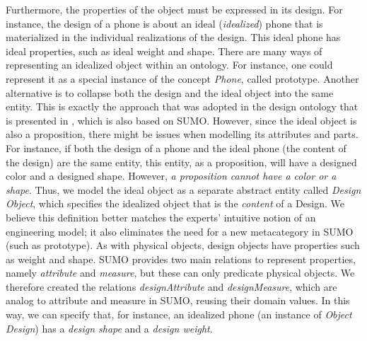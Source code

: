 \documentclass[preprint,12pt]{elsarticle}
\newcommand{\hlc}[2][yellow]{ {\sethlcolor{#1} \hl{#2}} }
\newcommand{\paulo}[1]{{\hlc[cyan]{\textbf{Paulo}: #1}}}
\newcommand{\joel}[1]{{\hlc[green]{\textbf{Joel}: #1}}}
\begin{document}
Furthermore, the properties of the object must be expressed in its design. For instance, the design of a phone is about an ideal (\emph{idealized}) phone that is materialized in the individual realizations of the design. This ideal phone has ideal properties, such as ideal weight and shape. There are many ways of representing an idealized object within an ontology. For instance, one could represent it as a special instance of the concept \emph{Phone}, called prototype. Another alternative is to collapse both the design and the ideal object into the same entity. This is exactly the approach that was adopted in the design ontology that is presented in \cite{Storga2010design}, which is also based on SUMO. However, since the ideal object is also a proposition, there might be issues when modelling its attributes and parts. For instance, if both the design of a phone and the ideal phone (the content of the design) are the same entity, this entity, as a proposition, will have a designed color and a designed shape. However, \emph{a proposition cannot have a color or a shape}. Thus, we model the ideal object as a separate abstract entity called \emph{Design Object}, which specifies the idealized object that is the \emph{content} of a Design. We believe this definition better matches the experts' intuitive notion of an engineering model; it also eliminates the need for a new metacategory in SUMO (such as prototype). As with physical objects, design objects have properties such as weight and shape. SUMO provides two main relations to represent properties, namely \emph{attribute} and \emph{measure}, but these can only predicate physical objects. We therefore created the relations \emph{designAttribute} and \emph{designMeasure}, which are analog to attribute and measure in SUMO, reusing their domain values. In this way, we can specify that, for instance, an idealized phone (an instance of \emph{Object Design}) has a \emph{design shape} and a \emph{design weight}. 


\end{document}
